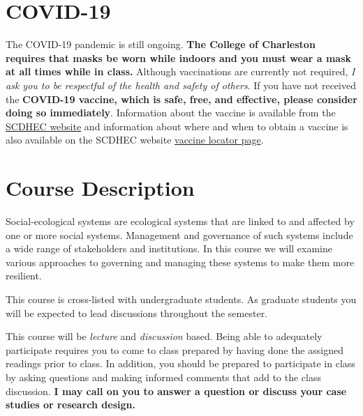 \hypertarget{covid-19}{%
\section{COVID-19}\label{covid-19}}

The COVID-19 pandemic is still ongoing. \textbf{The College of
Charleston requires that masks be worn while indoors and you must wear a
mask at all times while in class.} Although vaccinations are currently
not required, \emph{I ask you to be respectful of the health and safety
of others}. If you have not received the \textbf{COVID-19 vaccine, which
is safe, free, and effective, please consider doing so immediately}.
Information about the vaccine is available from the
\href{https://scdhec.gov/covid19/covid-19-vaccine}{SCDHEC website} and
information about where and when to obtain a vaccine is also available
on the SCDHEC website \href{https://vaxlocator.dhec.sc.gov/}{vaccine
locator page}.

\hypertarget{course-description}{%
\section{Course Description}\label{course-description}}

Social-ecological systems are ecological systems that are linked to and
affected by one or more social systems. Management and governance of
such systems include a wide range of stakeholders and institutions. In
this course we will examine various approaches to governing and managing
these systems to make them more resilient.

\vspace{0.10in}

\noindent This course is cross-listed with undergraduate students. As
graduate students you will be expected to lead discussions throughout
the semester.

\vspace{0.1in}

\noindent This course will be \emph{lecture} and \emph{discussion}
based. Being able to adequately participate requires you to come to
class prepared by having done the assigned readings prior to class. In
addition, you should be prepared to participate in class by asking
questions and making informed comments that add to the class discussion.
\textbf{I may call on you to answer a question or discuss your case
studies or research design.}

\vspace{0.1in}

